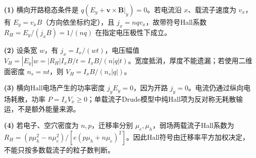 \par\noindent\textbf{(1)} 横向开路稳态条件是 \(q(E_y+\boldsymbol v\times\boldsymbol B|_y)=0\)。若电流沿 \(x\)、载流子速度为 \(v_x\)，有 \(E_y=v_xB\)（方向依坐标约定），且 \(j_x=nqv_x\)，故带符号Hall系数 \(R_H=E_y/(j_xB)=1/(nq)\) 在指定电压极性下成立。
\par\noindent\textbf{(2)} 设条宽 \(w\)，有 \(j_x=I_x/(wt)\)，电压幅值 \(V_H=|E_y|w=|R_H|I_xB/t=I_xB/(n|q|t)\)。宽度抵消，厚度不能遗漏；若使用二维面密度 \(n_s=nt\)，则 \(V_H=I_xB/(n_s|q|)\)。
\par\noindent\textbf{(3)} 横向Hall电场产生的功率密度 \(j_yE_y=0\)，因为开路 \(j_y=0\)。电流仍通过纵向电场耗散，功率 \(P=I_xV_x\ge0\)；单载流子Drude模型中纯Hall项为反对称无耗散输运，不是额外能量来源。
\par\noindent\textbf{(4)} 若电子、空穴密度为 \(n,p\)，迁移率分别 \(\mu_e,\mu_h\)，弱场两载流子Hall系数为 \(R_H=(p\mu_h^2-n\mu_e^2)/[e(p\mu_h+n\mu_e)^2]\)。因此Hall符号由迁移率平方加权决定，不能只按多数载流子的粒子数判断。
